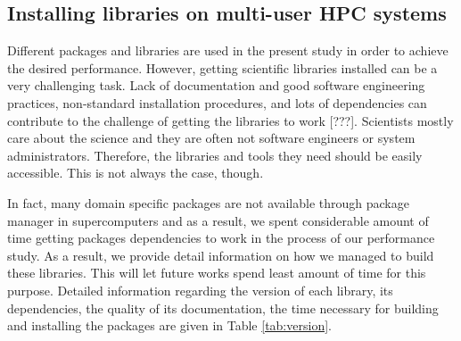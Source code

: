 \subsection{Installing libraries on multi-user HPC systems}
Different packages and libraries are used in the present study in order to achieve the desired performance. 
However, getting scientific libraries installed can be a very challenging task.
Lack of documentation and good software engineering practices, non-standard installation procedures, and lots of dependencies can contribute to the challenge of getting the libraries to work [???].
Scientists mostly care about the science and they are often not software engineers or system administrators. 
Therefore, the libraries and tools they need should be easily accessible. 
This is not always the case, though.

In fact, many domain specific packages are not available through package manager in supercomputers and as a result,
we spent considerable amount of time getting packages dependencies to work in the process of our performance study.
As a result, we provide detail information on how we managed to build these libraries.
This will let future works spend least amount of time for this purpose. 
Detailed information regarding the version of each library, its dependencies, the quality of its documentation, the time necessary for building and installing the packages are given in Table \ref{tab:version}. 

